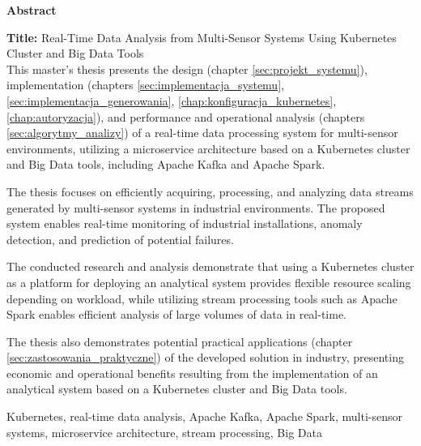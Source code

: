 \begin{abstract_en}
\begin{center}
\textbf{\large Abstract}
\end{center}
\vspace{0.5em}

\noindent\textbf{Title:} Real-Time Data Analysis from Multi-Sensor Systems Using Kubernetes Cluster and Big Data Tools\\

This master's thesis presents the design (chapter \ref{sec:projekt_systemu}), implementation (chapters \ref{sec:implementacja_systemu}, \ref{sec:implementacja_generowania}, \ref{chap:konfiguracja_kubernetes}, \ref{chap:autoryzacja}), and performance and operational analysis (chapters \ref{sec:algorytmy_analizy}) of a real-time data processing system for multi-sensor environments, utilizing a microservice architecture based on a Kubernetes cluster and Big Data tools, including Apache Kafka and Apache Spark.

The thesis focuses on efficiently acquiring, processing, and analyzing data streams generated by multi-sensor systems in industrial environments. The proposed system enables real-time monitoring of industrial installations, anomaly detection, and prediction of potential failures.

The conducted research and analysis demonstrate that using a Kubernetes cluster as a platform for deploying an analytical system provides flexible resource scaling depending on workload, while utilizing stream processing tools such as Apache Spark enables efficient analysis of large volumes of data in real-time.

The thesis also demonstrates potential practical applications (chapter \ref{sec:zastosowania_praktyczne}) of the developed solution in industry, presenting economic and operational benefits resulting from the implementation of an analytical system based on a Kubernetes cluster and Big Data tools.

\begin{keywords_en}
Kubernetes, real-time data analysis, Apache Kafka, Apache Spark, multi-sensor systems, microservice architecture, stream processing, Big Data
\end{keywords_en}
\end{abstract_en}